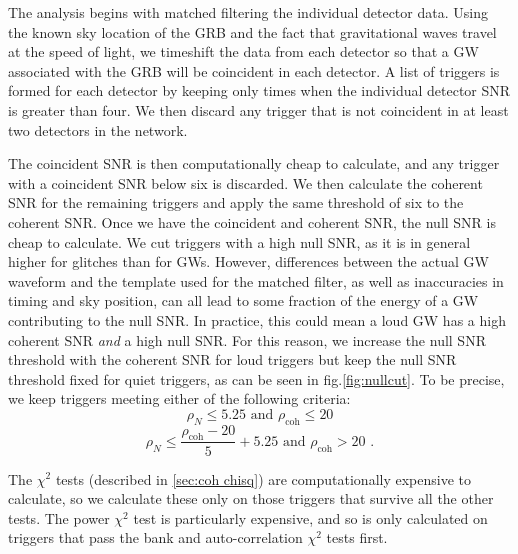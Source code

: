 \documentclass[11pt]{cuthesis}
\newcommand{\fs}{\text{ .}}
\begin{document}
The analysis begins with matched filtering the individual detector data. Using the known sky location of the GRB and the fact that gravitational waves travel at the speed of light, we timeshift the data from each detector so that a GW associated with the GRB will be coincident in each detector. A list of triggers is formed for each detector by keeping only times when the individual detector SNR is greater than four. We then discard any trigger that is not coincident in at least two detectors in the network. 

The coincident SNR is then computationally cheap to calculate, and any trigger with a coincident SNR below six is discarded. We then calculate the coherent SNR for the remaining triggers and apply the same threshold of six to the coherent SNR. Once we have the coincident and coherent SNR, the null SNR is cheap to calculate. We cut triggers with a high null SNR, as it is in general higher for glitches than for GWs. However, differences between the actual GW waveform and the template used for the matched filter, as well as inaccuracies in timing and sky position, can all lead to some fraction of the energy of a GW contributing to the null SNR. In practice, this could mean a loud GW has a high coherent SNR \textit{and} a high null SNR. For this reason, we increase the null SNR threshold with the coherent SNR for loud triggers but keep the null SNR threshold fixed for quiet triggers, as can be seen in fig.\ref{fig:nullcut}. To be precise, we keep triggers meeting either of the following criteria: 
\begin{equation}
\rho_N\leq5.25 \text{  and   } \rho_\text{coh}\leq 20
\end{equation} 
\begin{equation}
\rho_N \leq \frac{\rho_\text{coh} - 20}{5}+5.25  \text{  and   } \rho_\text{coh}> 20 \fs
\end{equation}

The $\chi^2$ tests (described in \ref{sec:coh chisq}) are computationally expensive to calculate, so we calculate these only on those triggers that survive all the other tests. The power $\chi^2$ test is particularly expensive, and so is only calculated on triggers that pass the bank and auto-correlation $\chi^2$ tests first.
\end{document}
